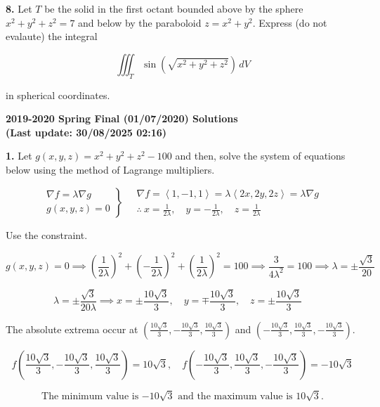 \documentclass{article}
\begin{document}
\vspace{1em}

\textbf{8.} Let $T$ be the solid in the first octant bounded above by the sphere $x^2+y^2+z^2=7$ and below by the paraboloid $z=x^2+y^2$. Express (do not evalaute) the integral

\[\iiint_T\sin\left(\sqrt{x^2+y^2+z^2}\right)\,dV\]

in spherical coordinates.

\newpage

\begin{center}
\textbf{2019-2020 Spring Final (01/07/2020) Solutions\\
(Last update: 30/08/2025 02:16)}
\end{center}

\textbf{1.} Let $g(x,y,z)=x^2+y^2+z^2-100$ and then, solve the system of equations below using the method of Lagrange multipliers.

\[
\left.
\begin{array}{l}
\displaystyle\nabla f=\lambda\nabla g\\
\displaystyle g(x,y,z)=0
\end{array}
\right\}\quad\begin{array}{c}
\nabla f=\left\langle1,-1,1\right\rangle=\lambda\left\langle2x,2y,2z\right\rangle=\lambda\nabla g\\[1em]\displaystyle\therefore\: x=\frac1{2\lambda},\quad y=-\frac1{2\lambda},\quad z=\frac1{2\lambda}
\end{array}
\]

Use the constraint.

\[g(x,y,z)=0\implies\left(\frac1{2\lambda}\right)^2+\left(-\frac1{2\lambda}\right)^2+\left(\frac1{2\lambda}\right)^2=100\implies\frac3{4\lambda^2}=100\implies\lambda=\pm\frac{\sqrt3}{20}\]

\[\lambda=\pm\frac{\sqrt3}{20\lambda}\implies x=\pm\frac{10\sqrt3}3,\quad y=\mp\frac{10\sqrt3}3,\quad z=\pm\frac{10\sqrt3}3\quad\]

The absolute extrema occur at $\left(\frac{10\sqrt3}3,-\frac{10\sqrt3}3,\frac{10\sqrt3}3\right)$ and $\left(-\frac{10\sqrt3}3,\frac{10\sqrt3}3,-\frac{10\sqrt3}3\right)$.

\[f\left(\frac{10\sqrt3}3,-\frac{10\sqrt3}3,\frac{10\sqrt3}3\right)=10\sqrt3,\quad f\left(-\frac{10\sqrt3}3,\frac{10\sqrt3}3,-\frac{10\sqrt3}3\right)=-10\sqrt3\]

\[\boxed{\text{The minimum value is }{-10\sqrt3}\text{ and the maximum value is }10\sqrt3.}\]
\end{document}

